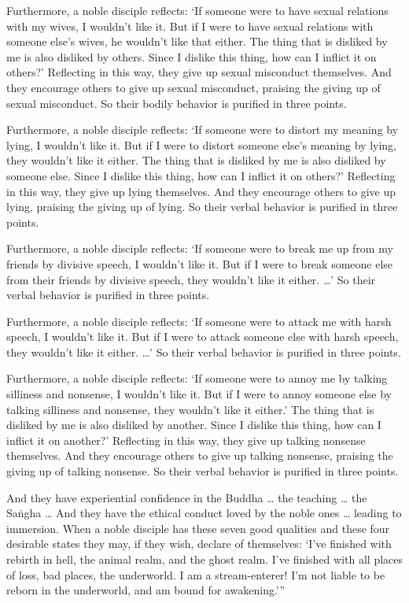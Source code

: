 \documentclass[12pt,openany]{book}%
\begin{document}
Furthermore, a noble disciple reflects: ‘If someone were to have sexual relations with my wives, I wouldn’t like it. But if I were to have sexual relations with someone else’s wives, he wouldn’t like that either. The thing that is disliked by me is also disliked by others. Since I dislike this thing, how can I inflict it on others?’ Reflecting in this way, they give up sexual misconduct themselves. And they encourage others to give up sexual misconduct, praising the giving up of sexual misconduct. So their bodily behavior is purified in three points. 

Furthermore, a noble disciple reflects: ‘If someone were to distort my meaning by lying, I wouldn’t like it. But if I were to distort someone else’s meaning by lying, they wouldn’t like it either. The thing that is disliked by me is also disliked by someone else. Since I dislike this thing, how can I inflict it on others?’ Reflecting in this way, they give up lying themselves. And they encourage others to give up lying, praising the giving up of lying. So their verbal behavior is purified in three points. 

Furthermore, a noble disciple reflects: ‘If someone were to break me up from my friends by divisive speech, I wouldn’t like it. But if I were to break someone else from their friends by divisive speech, they wouldn’t like it either. …’ So their verbal behavior is purified in three points. 

Furthermore, a noble disciple reflects: ‘If someone were to attack me with harsh speech, I wouldn’t like it. But if I were to attack someone else with harsh speech, they wouldn’t like it either. …’ So their verbal behavior is purified in three points. 

Furthermore, a noble disciple reflects: ‘If someone were to annoy me by talking silliness and nonsense, I wouldn’t like it. But if I were to annoy someone else by talking silliness and nonsense, they wouldn’t like it either.’ The thing that is disliked by me is also disliked by another. Since I dislike this thing, how can I inflict it on another?’ Reflecting in this way, they give up talking nonsense themselves. And they encourage others to give up talking nonsense, praising the giving up of talking nonsense. So their verbal behavior is purified in three points. 

And they have experiential confidence in the Buddha … the teaching … the \textsanskrit{Saṅgha} … And they have the ethical conduct loved by the noble ones … leading to immersion. When a noble disciple has these seven good qualities and these four desirable states they may, if they wish, declare of themselves: ‘I’ve finished with rebirth in hell, the animal realm, and the ghost realm. I’ve finished with all places of loss, bad places, the underworld. I am a stream-enterer! I’m not liable to be reborn in the underworld, and am bound for awakening.’” 
\end{document}
